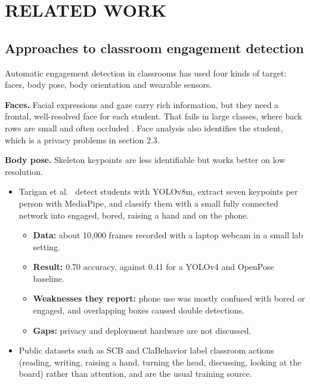 \chapter{RELATED WORK}

\section{Approaches to classroom engagement detection}

Automatic engagement detection in classrooms has used four kinds of target: faces, body pose, body orientation and wearable sensors.

\textbf{Faces.} Facial expressions and gaze carry rich information, but they need a frontal, well-resolved face for each student. That fails in large classes, where back rows are small and often occluded \cite{b1}. Face analysis also identifies the student, which is a privacy problems in section 2.3.

\textbf{Body pose.} Skeleton keypoints are less identifiable but works better on low resolution.

\begin{itemize}
\tightlist
\item
  Tarigan et al.~\cite{b2} detect students with YOLOv8m, extract seven keypoints per person with MediaPipe, and classify them with a small fully connected network into engaged, bored, raising a hand and on the phone.

  \begin{itemize}
  \tightlist
  \item
    \textbf{Data:} about 10,000 frames recorded with a laptop webcam in a small lab setting.
  \item
    \textbf{Result:} 0.70 accuracy, against 0.41 for a YOLOv4 and OpenPose baseline.
  \item
    \textbf{Weaknesses they report:} phone use was mostly confused with bored or engaged, and overlapping boxes caused double detections.
  \item
    \textbf{Gaps:} privacy and deployment hardware are not discussed.
  \end{itemize}
\item
  Public datasets such as SCB \cite{b3} and ClaBehavior \cite{b28} label classroom actions (reading, writing, raising a hand, turning the head, discussing, looking at the board) rather than attention, and are the usual training source.
\end{itemize}

